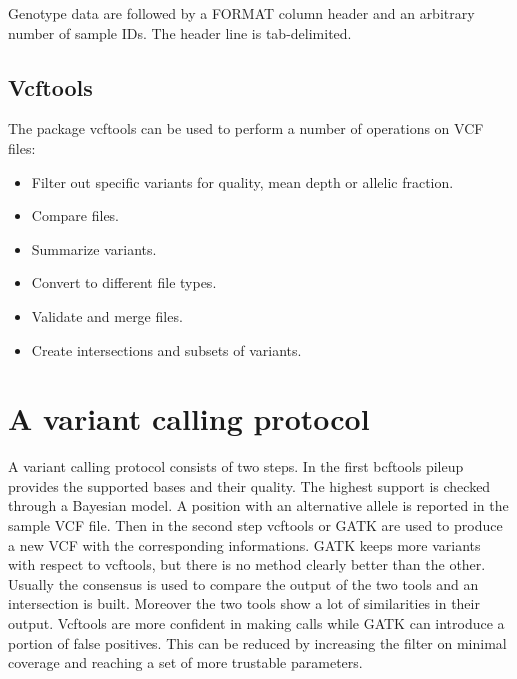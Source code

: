 	Genotype data are followed by a FORMAT column header and an arbitrary number of sample IDs.
	The header line is tab-delimited.

	\subsection{Vcftools}
	The package vcftools can be used to perform a number of operations on VCF files:

	\begin{multicols}{2}
		\begin{itemize}
			\item Filter out specific variants for quality, mean depth or allelic fraction.
			\item Compare files.
			\item Summarize variants.
			\item Convert to different file types.
			\item Validate and merge files.
			\item Create intersections and subsets of variants.
		\end{itemize}
	\end{multicols}

\section{A variant calling protocol}
A variant calling protocol consists of two steps.
In the first bcftools pileup provides the supported bases and their quality.
The highest support is checked through a Bayesian model.
A position with an alternative allele is reported in the sample VCF file.
Then in the second step vcftools or GATK are used to produce a new VCF with the corresponding informations.
GATK keeps more variants with respect to vcftools, but there is no method clearly better than the other.
Usually the consensus is used to compare the output of the two tools and an intersection is built.
Moreover the two tools show a lot of similarities in their output.
Vcftools are more confident in making calls while GATK can introduce a portion of false positives.
This can be reduced by increasing the filter on minimal coverage and reaching a set of more trustable parameters.
